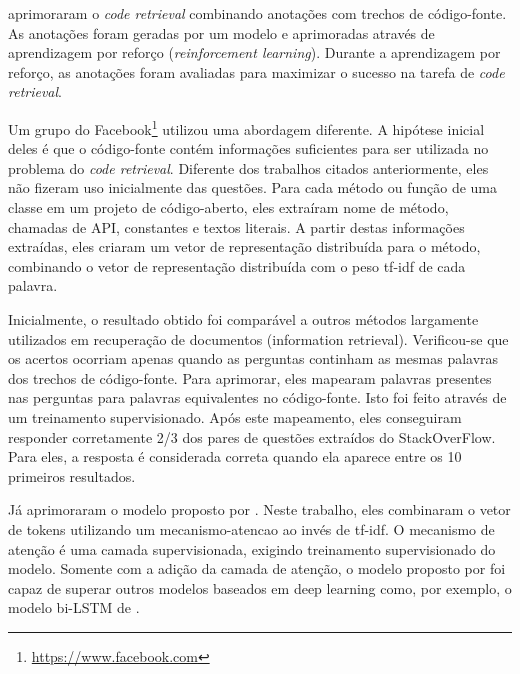 \cite{Yao-coacor:2019} aprimoraram o \textit{code retrieval} combinando anotações com trechos de código-fonte. As anotações foram geradas por um modelo e aprimoradas através de aprendizagem por reforço (\textit{reinforcement learning}). Durante a aprendizagem por reforço, as anotações foram avaliadas para maximizar o sucesso na tarefa de \textit{code retrieval}.

Um grupo do Facebook\footnote{\url{https://www.facebook.com}}\citep{Sachdev-neural-code-search:2018} utilizou uma abordagem diferente. A hipótese inicial deles é que o código-fonte contém informações suficientes para ser utilizada no problema do \textit{code retrieval}. Diferente dos trabalhos citados anteriormente, eles não fizeram uso inicialmente das questões. Para cada método ou função de uma classe em um projeto de código-aberto, eles extraíram nome de método, chamadas de API, constantes e textos literais. A partir destas informações extraídas, eles criaram um vetor de representação distribuída para o método, combinando o vetor de representação distribuída com o peso \acrshort{tf-idf} de cada palavra. 

Inicialmente, o resultado obtido foi comparável a outros métodos largamente utilizados em recuperação de documentos (information retrieval). Verificou-se que os acertos ocorriam apenas quando as perguntas continham as mesmas palavras dos trechos de código-fonte. Para aprimorar, eles mapearam palavras presentes nas perguntas para palavras equivalentes no código-fonte. Isto foi feito através de um treinamento supervisionado. Após este mapeamento, eles conseguiram responder corretamente 2/3 dos pares de questões extraídos do StackOverFlow. Para eles, a resposta é considerada correta quando ela aparece entre os 10 primeiros resultados.

Já \cite{cambronero-deep-learning-code-search:2019} aprimoraram o modelo proposto por \cite{Sachdev-neural-code-search:2018}. Neste trabalho, eles combinaram o vetor de tokens utilizando um \gls{mecanismo-atencao} ao invés de \acrshort{tf-idf}. O mecanismo de atenção é uma camada supervisionada, exigindo treinamento supervisionado do modelo. 
Somente com a adição da camada de atenção, o modelo proposto por \cite{cambronero-deep-learning-code-search:2019} foi capaz de superar outros modelos baseados em deep learning como, por exemplo, o modelo bi-LSTM de \cite{Gu-deep-code-search:2018}. 